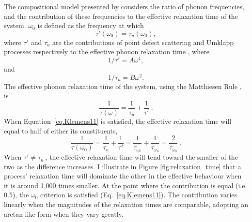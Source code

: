 The compositional model presented by \citeauthor{Klemens1960} considers the ratio of phonon frequencies, and the contribution of these frequencies to the effective relaxation time of the system. $\omega_{\mathrm{0}}$ is defined \citep[by][Eq.~11]{Klemens1960} as the frequency at which 
%
\begin{equation}
{\tau}'\left ( \omega_{\mathrm{0}} \right ) = \tau_{u}\left ( \omega_{\mathrm{0}} \right ),
\label{eq.Klemens11}
\end{equation}
%
where ${\tau}'$ and $\tau_{u}$ are the contributions of point defect scattering and Umklapp processes respectively to the effective phonon relaxation time \citep[][Eq.~2~\&~3]{Klemens1960}, where
%
\begin{equation}
1/{\tau}'= A\omega^{4},
\label{eq.Klemens2}
\end{equation}
%
and 
%
\begin{equation}
1/\tau_{u}=B\omega^{2}.
\label{eq.Klemens3}
\end{equation}
%
The effective phonon relaxation time of the system, using the Matthiesen Rule \citep[modified from][Eq.~7]{Klemens1960}, is  
%
\begin{equation}
\frac{1}{\tau \left ( \omega \right )} = \frac{1}{\tau_{u}} + \frac{1}{{\tau}'}\ .
\label{eq.Klemens7}
\end{equation}
%
When Equation~\ref{eq.Klemens11} is satisfied, the effective relaxation time will equal to half of either its constituents,
%
\begin{equation}
\frac{1}{\tau \left ( \omega_{0} \right )} = \frac{1}{\tau_{u}} + \frac{1}{{\tau}'} = \frac{1}{\tau_{\omega_{0}}} + \frac{1}{\tau_{\omega_{0}}} = \frac{2}{\tau_{\omega_{0}}}\ .
\label{eq.Klemens7ex}
\end{equation}
%
When ${\tau}' \neq \tau_{u}\ $, the effective relaxation time will tend toward the smaller of the two as the difference increases. I illustrate in Figure \ref{fig:relaxation_time} that a process' relaxation time will dominate the other in the effective behaviour when it is around 1,000 times smaller. At the point where the contribution is equal (i.e. 0.5), the $\omega_{0}$ criterion is satisfied (Eq.~\ref{eq.Klemens11}). The contribution varies linearly when the magnitudes of the relaxation times are comparable, adopting an arctan-like form when they vary greatly. 

